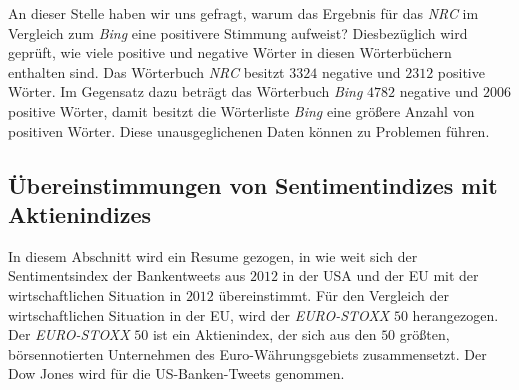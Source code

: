 An dieser Stelle haben wir uns gefragt, warum das Ergebnis für das \textit{NRC} im Vergleich zum \textit{Bing} eine positivere Stimmung aufweist? Diesbezüglich wird geprüft, wie viele positive und negative Wörter in diesen Wörterbüchern enthalten sind. Das Wörterbuch \textit{NRC} besitzt $3324$ negative und $2312$ positive Wörter. Im Gegensatz dazu beträgt das Wörterbuch \textit{Bing} $4782$ negative und $2006$ positive Wörter, damit besitzt die Wörterliste \textit{Bing} eine größere Anzahl von positiven Wörter. Diese unausgeglichenen Daten können zu Problemen führen. 

\subsection{Übereinstimmungen von Sentimentindizes mit Aktienindizes}\label{ueberein}
In diesem Abschnitt wird ein Resume gezogen, in wie weit sich der Sentimentsindex der Bankentweets aus $2012$ in der USA und der EU mit der wirtschaftlichen Situation in $2012$ übereinstimmt. Für den Vergleich der wirtschaftlichen Situation in der EU, wird der \textit{EURO-STOXX} $50$ herangezogen. Der \textit{EURO-STOXX} $50$ ist ein Aktienindex, der sich aus den $50$ größten, börsennotierten Unternehmen des Euro-Währungsgebiets zusammensetzt. Der Dow Jones wird für die US-Banken-Tweets genommen.

